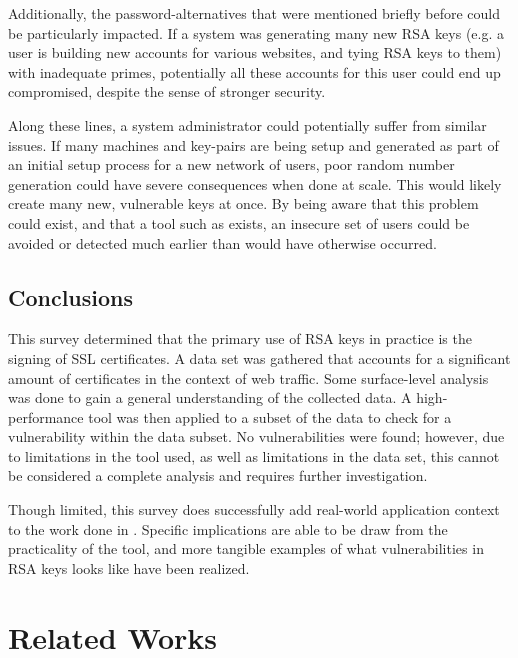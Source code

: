 \documentclass[smallextended]{svjour3}       %
\begin{document}
Additionally, the password-alternatives that were mentioned briefly before
could be particularly impacted. If a system was generating many new RSA keys
(e.g. a user is building new accounts for various websites, and tying RSA keys
to them) with inadequate primes, potentially all these accounts for this user
could end up compromised, despite the sense of stronger security.

Along these lines, a system administrator could potentially suffer from similar
issues. If many machines and key-pairs are being setup and generated as part of
an initial setup process for a new network of users, poor random number
generation could have severe consequences when done at scale. This would likely
create many new, vulnerable keys at once. By being aware that this problem
could exist, and that a tool such as \cite{scharfglass2012breaking} exists, an
insecure set of users could be avoided or detected much earlier than would have
otherwise occurred.

\subsection{Conclusions}
\label{subsec:conc}
This survey determined that the primary use of RSA keys in practice is the
signing of SSL certificates. A data set was gathered that accounts for a
significant amount of certificates in the context of web traffic. Some
surface-level analysis was done to gain a general understanding of the
collected data. A high-performance tool was then applied to a subset of the
data to check for a vulnerability within the data subset. No vulnerabilities
were found; however, due to limitations in the tool used, as well as
limitations in the data set, this cannot be considered a complete analysis
and requires further investigation.

Though limited, this survey does successfully add real-world application
context to the work done in \cite{scharfglass2012breaking}. Specific
implications are able to be draw from the practicality of the tool, and more
tangible examples of what vulnerabilities in RSA keys looks like have been
realized.


\section{Related Works}
\label{sec:related}
\end{document}
